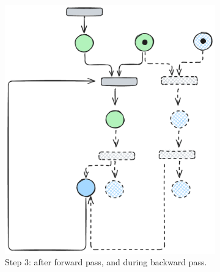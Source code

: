 \begin{figure}[htbp]
	\vspace{1em}
	
	\begin{subfigure}[b]{0.30\textwidth}
		\centering
		\includegraphics[width=\textwidth]{plots/bidirectional_pruning_step_c_updated.pdf}
		\caption{Step 3: after forward pass, and during backward pass.}
		\label{fig:step:c}
	\end{subfigure}\hfill
	\begin{subfigure}[b]{0.23\textwidth}
		\centering

\end{subfigure}
\end{figure}

